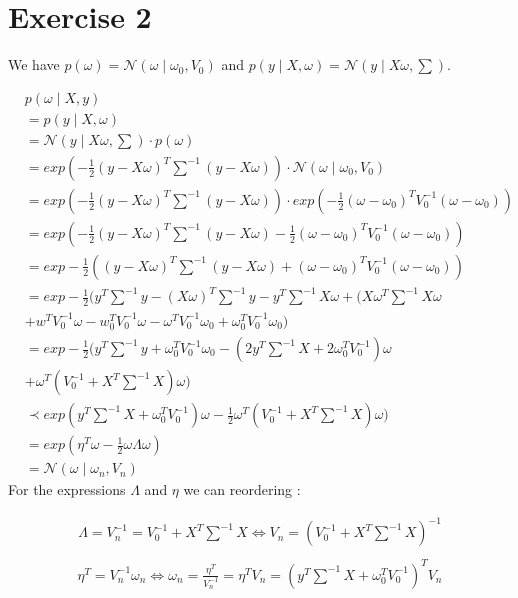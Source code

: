 \documentclass{article}
\begin{document}
\section*{Exercise 2}

We have $p(\omega) = \mathcal{N}(\omega \mid \omega_0, V_0)$ and $p(y \mid X, \omega) = \mathcal{N}(y \mid X\omega, \sum)$.

\begin{align*}
&p(\omega \mid X, y) \\
&= p(y\mid X,\omega) \\
 &= \mathcal{N}(y\mid X\omega, \sum) \cdot p(\omega) \\
 &= exp(-\frac{1}{2} (y - X\omega) ^{T} \sum \nolimits ^{-1}(y - X\omega)) \cdot \mathcal{N}(\omega \mid \omega_0, V_0) \\
 &= exp(-\frac{1}{2} (y - X\omega) ^{T} \sum \nolimits ^{-1}(y - X\omega)) \cdot exp(-\frac{1}{2}(\omega - \omega_0) ^{T} V_0 ^{-1}(\omega - \omega_0)) \\
 &= exp(-\frac{1}{2} (y - X\omega) ^{T} \sum \nolimits ^{-1}(y - X\omega) -\frac{1}{2}(\omega - \omega_0) ^{T} V_0 ^{-1}(\omega - \omega_0)) \\
  &= exp -\frac{1}{2} ((y - X\omega) ^{T} \sum \nolimits ^{-1}(y - X\omega) + (\omega - \omega_0) ^{T} V_0 ^{-1}(\omega - \omega_0)) \\
  &= exp -\frac{1}{2}(y^{T} \sum \nolimits ^{-1} y- (X\omega)^{T} \sum \nolimits ^{-1} y - y ^{T} \sum \nolimits ^{-1} X\omega + (X\omega^{T} \sum \nolimits ^{-1} X \omega \\
  &+ w^{T} V_0^{-1} \omega - w_0^{T}V_0^{-1}\omega - \omega^{T} V_0^{-1}\omega_0 + \omega_0^{T} V_0^{-1} \omega_0) \\
  &= exp -\frac{1}{2}(y^{T} \sum \nolimits^{-1} y + \omega_0^{T}V_0^{-1}\omega_0 - (2y^{T} \sum \nolimits ^{-1} X + 2 \omega_0^{T} V_0^{-1}) \omega \\
  &+ \omega^{T}(V_0^{-1} + X^{T} \sum \nolimits ^{-1} X) \omega) \\
  &\prec exp(y^{T} \sum \nolimits ^{-1} X + \omega_0^{T} V_0^{-1}) \omega - \frac{1}{2} \omega^{T}(V_0^{-1} + X^{T} \sum \nolimits ^{-1} X) \omega) \\
  &= exp(\eta^{T} \omega - \frac{1}{2} \omega \Lambda \omega) \\
  &= \mathcal{N}(\omega \mid \omega_n, V_n)
\end{align*}
For the expressions $\Lambda$ and $\eta$ we can reordering :

\begin{align*}
\Lambda = V_n^{-1} = V_0^{-1} + X^{T} \sum \nolimits ^{-1} X \Leftrightarrow V_n = (V_0^{-1} + X^{T} \sum \nolimits^{-1} X)^{-1} \\
\end{align*}
\begin{align*}
\eta^{T} = V_n^{-1} \omega_n \Leftrightarrow \omega_n = \frac{\eta^{T}}{V_n^{-1}} = \eta^{T} V_n = (y^{T} \sum \nolimits ^{-1} X + \omega_0^{T} V_0^{-1})^{T} V_n \\
\end{align*}
\end{document}
